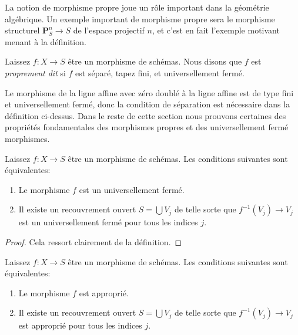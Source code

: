 \noindent
La notion de morphisme propre joue un rôle important dans la géométrie algébrique. Un exemple important de morphisme propre sera le morphisme structurel $\mathbf{P}^n_S \to S$ de l'espace projectif $n$, et c'est en fait l'exemple motivant menant à la définition.

\begin{definition}

\label{definition-proper}
Laissez $f : X \to S$ être un morphisme de schémas. Nous disons que $f$ est {\it proprement dit} si $f$ est séparé, tapez fini, et universellement fermé.
\end{definition}

\noindent
Le morphisme de la ligne affine avec zéro doublé à la ligne affine est de type fini et universellement fermé, donc la condition de séparation est nécessaire dans la définition ci-dessus. Dans le reste de cette section nous prouvons certaines des propriétés fondamentales des morphismes propres et des universellement fermé morphismes.

\begin{lemma}

\label{lemma-universally-closed-local-on-the-base}
Laissez $f : X \to S$ être un morphisme de schémas. Les conditions suivantes sont équivalentes:
\begin{enumerate}
\item Le morphisme $f$ est un universellement fermé.
\item Il existe un recouvrement ouvert $S = \bigcup V_j$ de telle sorte que $f^{-1}(V_j) \to V_j$ est un universellement fermé pour tous les indices $j$.
\end{enumerate}

\end{lemma}

\begin{proof}

Cela ressort clairement de la définition.

\end{proof}

\begin{lemma}

\label{lemma-proper-local-on-the-base}
Laissez $f : X \to S$ être un morphisme de schémas. Les conditions suivantes sont équivalentes:
\begin{enumerate}
\item Le morphisme $f$ est approprié.
\item Il existe un recouvrement ouvert $S = \bigcup V_j$ de telle sorte que $f^{-1}(V_j) \to V_j$ est approprié pour tous les indices $j$.
\end{enumerate}

\end{lemma}

